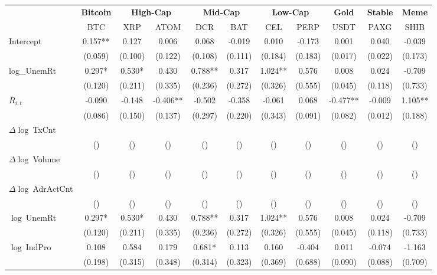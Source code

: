 \begin{table}[ht]
\centering
\scriptsize
\setlength{\tabcolsep}{4pt}
\begin{tabular}{l *{10}{c}}
\toprule
&\multicolumn{1}{c}{\textbf{Bitcoin}}&\multicolumn{2}{c}{\textbf{High-Cap}}&\multicolumn{2}{c}{\textbf{Mid-Cap}}&\multicolumn{2}{c}{\textbf{Low-Cap}}&\multicolumn{1}{c}{\textbf{Gold}}&\multicolumn{1}{c}{\textbf{Stable}}&\multicolumn{1}{c}{\textbf{Meme}}\\
\addlinespace
 & BTC & XRP & ATOM & DCR & BAT & CEL & PERP & USDT & PAXG & SHIB \\
\midrule
Intercept & 0.157** & 0.127 & 0.006 & 0.068 & -0.019 & 0.010 & -0.173 & 0.001 & 0.040 & -0.039 \\
 & (0.059) & (0.100) & (0.122) & (0.108) & (0.111) & (0.184) & (0.183) & (0.017) & (0.022) & (0.173) \\
\addlinespace
log_UnemRt & 0.297* & 0.530* & 0.430 & 0.788** & 0.317 & 1.024** & 0.576 & 0.008 & 0.024 & -0.709 \\
 & (0.120) & (0.211) & (0.335) & (0.236) & (0.272) & (0.326) & (0.555) & (0.045) & (0.118) & (0.733) \\
\addlinespace
$R_{i,t}$ & -0.090 & -0.148 & -0.406** & -0.502 & -0.358 & -0.061 & 0.068 & -0.477** & -0.009 & 1.105** \\
 & (0.086) & (0.150) & (0.137) & (0.297) & (0.220) & (0.343) & (0.091) & (0.082) & (0.012) & (0.188) \\
\addlinespace
$\Delta\log\ $TxCnt &  &  &  &  &  &  &  &  &  &  \\
 & () & () & () & () & () & () & () & () & () & () \\
\addlinespace
$\Delta\log\ $Volume &  &  &  &  &  &  &  &  &  &  \\
 & () & () & () & () & () & () & () & () & () & () \\
\addlinespace
$\Delta\log\ $AdrActCnt &  &  &  &  &  &  &  &  &  &  \\
 & () & () & () & () & () & () & () & () & () & () \\
\addlinespace
$\log\ $UnemRt & 0.297* & 0.530* & 0.430 & 0.788** & 0.317 & 1.024** & 0.576 & 0.008 & 0.024 & -0.709 \\
 & (0.120) & (0.211) & (0.335) & (0.236) & (0.272) & (0.326) & (0.555) & (0.045) & (0.118) & (0.733) \\
\addlinespace
$\log\ $IndPro & 0.108 & 0.584 & 0.179 & 0.681* & 0.113 & 0.160 & -0.404 & 0.011 & -0.074 & -1.163 \\
 & (0.198) & (0.315) & (0.348) & (0.314) & (0.323) & (0.369) & (0.688) & (0.090) & (0.088) & (0.709) \\

\end{tabular}
\end{table}
